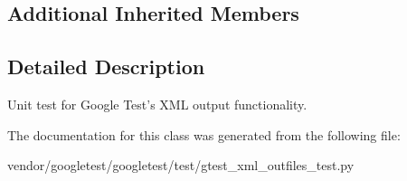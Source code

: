 \subsection*{Additional Inherited Members}


\subsection{Detailed Description}
\begin{DoxyVerb}Unit test for Google Test's XML output functionality.\end{DoxyVerb}
 

The documentation for this class was generated from the following file\+:\begin{DoxyCompactItemize}
\item 
vendor/googletest/googletest/test/gtest\+\_\+xml\+\_\+outfiles\+\_\+test.\+py\end{DoxyCompactItemize}
